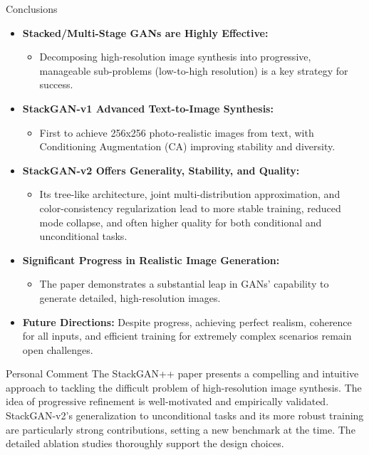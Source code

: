 \documentclass{beamer}
\begin{document}
\begin{frame}{Conclusions}
    \begin{itemize}
        \item \textbf{Stacked/Multi-Stage GANs are Highly Effective:}
            \begin{itemize}
                \item Decomposing high-resolution image synthesis into progressive, manageable sub-problems (low-to-high resolution) is a key strategy for success.
            \end{itemize}
        \item \textbf{StackGAN-v1 Advanced Text-to-Image Synthesis:}
            \begin{itemize}
                \item First to achieve 256x256 photo-realistic images from text, with Conditioning Augmentation (CA) improving stability and diversity.
            \end{itemize}
        \item \textbf{StackGAN-v2 Offers Generality, Stability, and Quality:}
            \begin{itemize}
                \item Its tree-like architecture, joint multi-distribution approximation, and color-consistency regularization lead to more stable training, reduced mode collapse, and often higher quality for both conditional and unconditional tasks.
            \end{itemize}
        \item \textbf{Significant Progress in Realistic Image Generation:}
            \begin{itemize}
                \item The paper demonstrates a substantial leap in GANs' capability to generate detailed, high-resolution images.
            \end{itemize}
        \item \textbf{Future Directions:} Despite progress, achieving perfect realism, coherence for all inputs, and efficient training for extremely complex scenarios remain open challenges.
    \end{itemize}
    \vspace{0.3cm}
    \begin{block}{Personal Comment}
        The StackGAN++ paper presents a compelling and intuitive approach to tackling the difficult problem of high-resolution image synthesis. The idea of progressive refinement is well-motivated and empirically validated. StackGAN-v2's generalization to unconditional tasks and its more robust training are particularly strong contributions, setting a new benchmark at the time. The detailed ablation studies thoroughly support the design choices.
    \end{block}
\end{frame}
\end{document}

